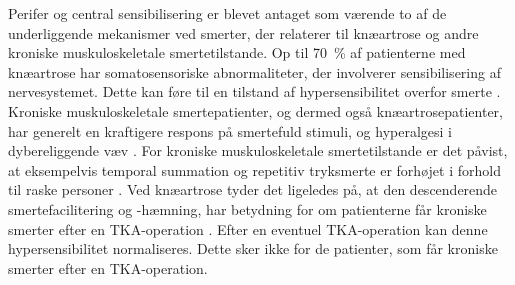 Perifer og central sensibilisering er blevet antaget som værende to af de underliggende mekanismer ved smerter, der relaterer til knæartrose og andre kroniske muskuloskeletale smertetilstande. Op til 70~\% af patienterne med knæartrose har somatosensoriske abnormaliteter, der involverer sensibilisering af nervesystemet. \citep{Arendt-Nielsen2010} Dette kan føre til en tilstand af hypersensibilitet overfor smerte \citep{Petersen2016}. Kroniske muskuloskeletale smertepatienter, og dermed også knæartrosepatienter, har generelt en kraftigere respons på smertefuld stimuli, og hyperalgesi i dybereliggende væv \citep{Arendt-Nielsen2010}. For kroniske muskuloskeletale smertetilstande er det påvist, at eksempelvis temporal summation og repetitiv tryksmerte er forhøjet i forhold til raske personer \citep{graven2012}. Ved knæartrose tyder det ligeledes på, at den descenderende smertefacilitering og -hæmning, har betydning for om patienterne får kroniske smerter efter en TKA-operation \citep{Petersen2016}. Efter en eventuel TKA-operation kan denne hypersensibilitet normaliseres. Dette sker ikke for de patienter, som får kroniske smerter efter en TKA-operation. \citep{Petersen2016} \citep{graven2012}







